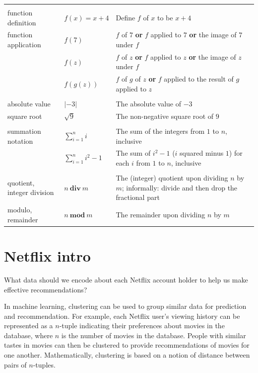 \documentclass[12pt, oneside]{article}
\begin{document}
\begin{center}
\begin{tabular}{|llp{9cm}|}
&&\\
function definition & $f(x) = x + 4$ & Define $f$ of $x$ to be $x + 4$ \\
function application & $f(7)$ & $f$ of $7$ {\bf or} $f$ applied to $7$ {\bf or} the image of $7$ under $f$\\
                     & $f(z)$ & $f$ of $z$ {\bf or} $f$ applied to $z$ {\bf or} the image of $z$ under $f$\\
                     & $f(g(z))$ & $f$ of $g$ of $z$ {\bf or} $f$ applied to the result of $g$ applied to $z$ \\
&&\\
absolute value & $\lvert -3 \rvert$ & The absolute value of $-3$ \\
square root & $\sqrt{9}$ & The non-negative square root of $9$ \\
&&\\
summation notation & $\displaystyle \sum_{i=1}^n i$ & The sum of the integers from $1$ to $n$, inclusive \\
                    & $\displaystyle \sum_{i=1}^n i^2 - 1$ & The sum of $i^2 - 1$ ($i$ squared minus $1$) for each $i$ from $1$ to $n$, inclusive \\
&&\\
quotient, integer division & $n~\textbf{div}~m$ & The (integer) quotient upon dividing $n$ by $m$; informally: divide and then 
drop the fractional part\\
modulo, remainder & $n~\textbf{mod}~m$ & The remainder upon dividing $n$ by $m$ \\

\hline
\end{tabular}
\end{center} \vfill
\section*{Netflix intro}


What data should we encode about each Netflix account holder to help us make effective recommendations?

\vfill

In machine learning, clustering can be used to group similar data for prediction and recommendation.  For example,
each Netflix user's viewing history can be represented as a $n$-tuple indicating their preferences about
movies in the database, where $n$ is the number of movies in the database.  People with similar tastes in movies can then be clustered to provide recommendations
of movies for one another.  Mathematically, clustering is based on a notion of distance between pairs of $n$-tuples.
\end{document}
